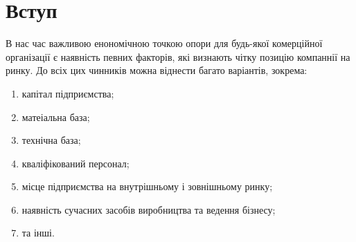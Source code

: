 




\fontsize{14}{14pt}\selectfont

\maketitle


\tableofcontents


%

\section{Вступ}
В нас час важливою енономічною точкою опори для будь-якої комерційної організації є наявність певних факторів, які визнають чітку позицію компаннії на ринку. До всіх цих чинників можна віднести багато варіантів, зокрема:
\begin{enumerate}
\item капітал підприємства;
\item матеіальна база;
\item технічна база;
\item кваліфікований персонал;
\item місце підприємства на внутрішньому і зовнішньому ринку;
\item наявність сучасних засобів виробництва та ведення бізнесу;
\item та інші.
\end{enumerate}

